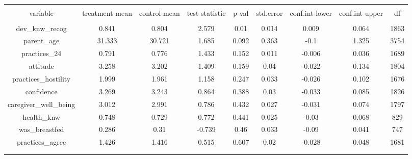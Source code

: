 
\begin{table}[!htbp] \centering 
  \caption{} 
  \label{tbl:treatment_baseline_imbalance_bulgaria} 
\begin{tabular}{@{\extracolsep{5pt}} ccccccccc} 
\\[-1.8ex]\hline 
\hline \\[-1.8ex] 
variable & treatment mean & control mean & test statistic & p-val & std.error & conf.int lower & conf.int upper & df \\ 
\hline \\[-1.8ex] 
dev\_knw\_recog & 0.841 & 0.804 & 2.579 & 0.01 & 0.014 & 0.009 & 0.064 & 1863 \\ 
parent\_age & 31.333 & 30.721 & 1.685 & 0.092 & 0.363 & -0.1 & 1.325 & 3754 \\ 
practices\_24 & 0.791 & 0.776 & 1.433 & 0.152 & 0.011 & -0.006 & 0.036 & 1689 \\ 
attitude & 3.258 & 3.202 & 1.409 & 0.159 & 0.04 & -0.022 & 0.134 & 1804 \\ 
practices\_hostility & 1.999 & 1.961 & 1.158 & 0.247 & 0.033 & -0.026 & 0.102 & 1676 \\ 
confidence & 3.269 & 3.243 & 0.864 & 0.388 & 0.03 & -0.033 & 0.085 & 1826 \\ 
caregiver\_well\_being & 3.012 & 2.991 & 0.786 & 0.432 & 0.027 & -0.031 & 0.074 & 1797 \\ 
health\_knw & 0.748 & 0.729 & 0.772 & 0.441 & 0.025 & -0.03 & 0.068 & 829 \\ 
was\_breastfed & 0.286 & 0.31 & -0.739 & 0.46 & 0.033 & -0.09 & 0.041 & 747 \\ 
practices\_agree & 1.426 & 1.416 & 0.515 & 0.607 & 0.02 & -0.028 & 0.048 & 1681 \\ 
 &  &  &  &  &  &  &  &  \\ 
\hline \\[-1.8ex] 
\end{tabular} 
\end{table} 
